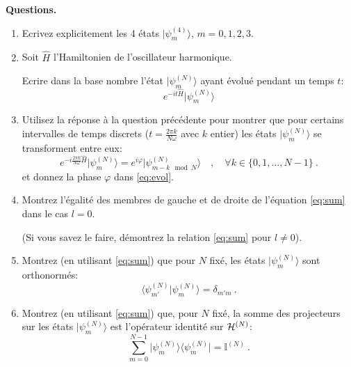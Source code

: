 {\bf Questions.}

\begin{enumerate}



\item

Ecrivez explicitement les 4 états $\lvert \psi^{(4)}_m\rangle$, $m=0,1,2,3$.


\item


Soit $\hat H$  l'Hamiltonien de l'oscillateur harmonique.

Ecrire dans la base nombre l'état $\lvert \psi^{(N)}_m\rangle$ ayant évolué pendant un temps $t$:
\begin{equation}
e^{-i t \hat H} \lvert \psi^{(N)}_m\rangle
\end{equation}

\item
\label{poin5}

Utilisez la réponse à la question précédente pour montrer que pour certains intervalles de temps discrets ($t={\frac{ 2 \pi k}{N \omega}}$ avec $k$ entier) les états $\lvert \psi^{(N)}_m\rangle$ se transforment entre eux:
\begin{equation}
e^{-i \frac{ 2 \pi k}{N \omega}\hat H} \lvert \psi^{(N)}_m\rangle = e^{i\varphi}
\lvert \psi^{(N)}_{{m - k} \mod N}\rangle
 \quad , \quad  \forall k\in \{0,1,\dotsc,N-1\}
\ . \label{eq:evol}
\end{equation}
et donnez la phase $\varphi$ dans \eqref{eq:evol}.

\item 

Montrez l'égalité des membres de gauche et de droite de l'équation \eqref{eq:sum} dans le cas $l=0$.

(Si vous savez le faire, démontrez la relation \eqref{eq:sum}  pour $l\neq 0$).

\item
\label{poin3}

Montrez (en utilisant \eqref{eq:sum}) que pour $N$ fixé, les états $\lvert \psi^{(N)}_m\rangle$ sont orthonormés:
\begin{equation}
\langle \psi^{(N)}_{m'} \vert \psi^{(N)}_m\rangle = \delta_{m' m}\ .
\end{equation}

\item
\label{poin4}

Montrez  (en utilisant \eqref{eq:sum})  que, pour $N$ fixé, la somme des projecteurs sur les états 
$\lvert \psi^{(N)}_m\rangle$  est l'opérateur identité sur ${\cal H}^{(N)}$:
\begin{equation}
\sum_{m=0}^{N-1} \lvert  \psi^{(N)}_{m} \rangle \langle \psi^{(N)}_m\rvert = \mathbb{I}^{(N)}\ .
\end{equation}


\end{enumerate}